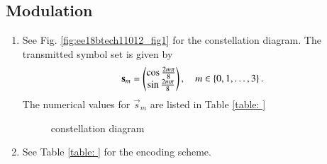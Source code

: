 \subsection{Modulation}
\begin{enumerate}[label=\thesubsection.\arabic*.,ref=\thesubsection.\theenumi]



\item See Fig. \ref{fig:ee18btech11012_fig1} for the constellation diagram.  The transmitted symbol set is given by 
\begin{align}
\mathbf{s}_m = \begin{pmatrix}\cos \frac{2m\pi}{8}\\ \sin \frac{2m\pi}{8}\end{pmatrix}, \quad m \in \left\{0, 1, \dots, 3\right\}.
\end{align}
%
The numerical values for $\vec{s}_m$ are listed in Table \ref{table: }
\begin{figure}[!ht]
                \resizebox{\columnwidth}{!}{}
\label{fig:ee18btech11041_fig1}
\caption{constellation diagram}
\end{figure}

%
\item See Table \ref{table: } for the encoding scheme.
\end{enumerate}
